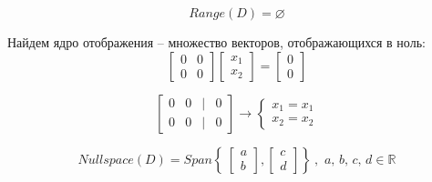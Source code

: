 \documentclass[a5paper, 10pt]{article}
\theoremstyle{definition}
\theoremstyle{plain}
\theoremstyle{remark}
\begin{document}
\begin{equation}
Range(D) = \varnothing
\end{equation}

Найдем ядро отображения -- множество векторов, отображающихся в ноль:
\begin{equation}
\begin{bmatrix}
0 & 0\\
0 & 0
\end{bmatrix}
\begin{bmatrix}
x_1\\
x_2
\end{bmatrix}
=
\begin{bmatrix}
0\\
0
\end{bmatrix}
\end{equation}

\begin{equation}
\begin{bmatrix}
0 & 0 & | & 0\\
0 & 0 & | & 0
\end{bmatrix}
\to
\begin{cases}
x_1 = x_1\\
x_2 = x_2
\end{cases}
\end{equation}

\begin{equation}
Nullspace (D) = Span
 \left\{\
\begin{bmatrix}
a\\
b
\end{bmatrix}
,
\begin{bmatrix}
c\\
d
\end{bmatrix}
\right\}\
, \,\,  a, \, b, \, c, \, d \in \mathbb{R}
\end{equation}



\subsection{}
\end{document}
